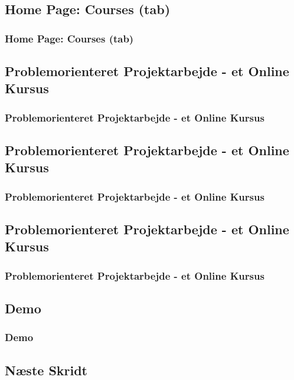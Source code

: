 \documentclass[t, aspectratio=169]{beamer}
\begin{document}
\subsection{Home Page: Courses (tab)}
\begin{frame}[fragile]
  \frametitle{Home Page: Courses (tab)}
  \vspace{1mm}
  
\end{frame}

\subsection{Problemorienteret Projektarbejde - et Online Kursus}
\begin{frame}[fragile]
  \frametitle{Problemorienteret Projektarbejde - et Online Kursus}
  \vspace{1mm}
  
\end{frame}

\subsection{Problemorienteret Projektarbejde - et Online Kursus}
\begin{frame}[fragile]
  \frametitle{Problemorienteret Projektarbejde - et Online Kursus}
  \vspace{1mm}
  
\end{frame}

\subsection{Problemorienteret Projektarbejde - et Online Kursus}
\begin{frame}[fragile]
  \frametitle{Problemorienteret Projektarbejde - et Online Kursus}
  \vspace{1mm}
  
\end{frame}

\subsection{Demo}
\begin{frame}[fragile]
  \frametitle{Demo}
  \vspace{1mm}
  
\end{frame}

\subsection{Næste Skridt}
\begin{frame}[fragile]
  \frametitle{}
  \vspace{1mm}
  
\end{frame}
\end{document}

